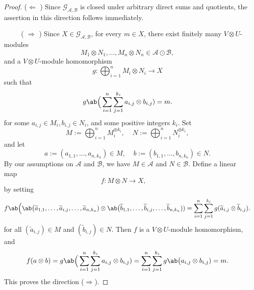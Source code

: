 \documentclass[12pt, english]{article}
\numberwithin{equation}{section}
\theoremstyle{plain}
\theoremstyle{definition}
\theoremstyle{remark}
\begin{document}
	\begin{proof}
		
		($\Leftarrow$ ) Since  $\mathcal{G}_{\mathcal{A}, \mathcal{B}}$ is closed under arbitrary direct sums and quotients,  the assertion in this direction follows immediately.
		
		~~~~~( $ \Rightarrow $ ) Since $X \in \mathcal{G}_{\mathcal{A}, \mathcal{B}}$, for every $m \in X$, there exist finitely many $V \otimes U$-modules
		\[
		M_1 \otimes N_1, \dots, M_n \otimes N_n \in \mathcal{A} \odot \mathcal{B},
		\]
		and a $V \otimes U$-module homomorphism
		\[
		g \colon \bigoplus_{i = 1}^n M_i \otimes N_i \to X
		\]
		such that
		\[
		g \ab\Big(\sum_{i = 1}^n \sum_{j = 1}^{k_i} a_{i, j} \otimes b_{i, j}) = m.
		\]
		for some $a_{i, j} \in M_i, b_{i, j} \in N_i$, and some positive integers $k_i$.
		Set
		\[
		M := \bigoplus_{i = 1}^n M_i^{\oplus k_i}, \;\;\;\; N := \bigoplus_{i = 1}^n N_i^{ \oplus k_i},
		\]
		and let
		\[
		a := (a_{1, 1}, \dots, a_{n, k_n}) \in M, \; \;\;\; b := (b_{1, 1}, \dots, b_{n, k_n}) \in N.
		\]
		By our assumptions on $\mathcal{A}$ and $\mathcal{B}$, we have $M \in \mathcal{A}$ and $N \in \mathcal{B}$.
		Define a linear map
		\[
		f \colon M \otimes N \longrightarrow X, \;\; \;\;
		\]
		by setting
		\[
		f \ab\Big( \ab\big(\widetilde{a}_{1, 1}, \dots, \widetilde{a}_{i, j}, \dots, \widetilde{a}_{n, k_n}) \otimes
		\ab\big(\widetilde{b}_{1, 1}, \dots, \widetilde{b}_{i, j}, \dots, \widetilde{b}_{n, k_n}) ) = \sum_{i = 1}^n \sum_{j = 1}^{k_i} g(\widetilde{a}_{i, j} \otimes \widetilde{b}_{i, j}).
		\]
		for all $(\widetilde{a}_{i, j}) \in M$ and $(\widetilde{b}_{i, j}) \in N$.  Then $f$ is a $V \otimes U$-module homomorphism, and
		\[
		f(a \otimes b) = g \ab\Big(\sum_{i = 1}^n \sum_{j = 1}^{k_i} a_{i, j} \otimes b_{i, j}) = \sum_{i = 1}^n \sum_{j = 1}^{k_i} g \ab\big(a_{i, j} \otimes b_{i, j}) = m.
		\]
		This proves the direction ($ \Rightarrow $).
	\end{proof}
	
\end{document}
